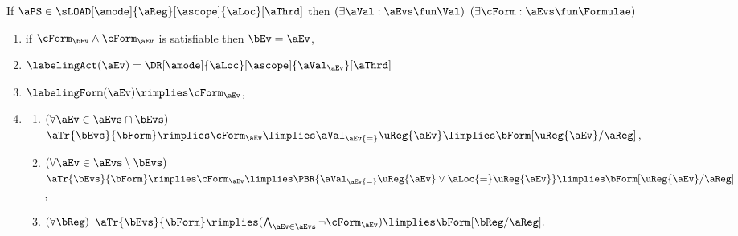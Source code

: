 \medskip
\noindent
If $\aPS \in \sLOAD[\amode]{\aReg}[\ascope]{\aLoc}[\aThrd]$ then
$(\exists\aVal:\aEvs\fun\Val)$
$(\exists\cForm:\aEvs\fun\Formulae)$ 
\begin{enumerate}[topsep=0pt,label=(\textsc{r}\arabic*),ref=\textsc{r}\arabic*]
\item \label{read-E-x}
  if $\cForm_\bEv\land\cForm_\aEv$ is satisfiable then $\bEv=\aEv$,
\item \label{read-lambda-x}
  $\labelingAct(\aEv) = \DR[\amode]{\aLoc}[\ascope]{\aVal_\aEv}[\aThrd]$
\item \label{read-kappa-x}
  \begin{math}
    \labelingForm(\aEv) \rimplies
    \cForm_\aEv
  \end{math},
\item[] 
  \begin{enumerate}[leftmargin=0pt]
  \item \label{read-tau-dependent-x}
    \begin{math}
      (\forall\aEv\in\aEvs\cap\bEvs)
    \end{math}
    \begin{math}
      \aTr{\bEvs}{\bForm} \rimplies
      \cForm_\aEv
      \limplies \aVal_\aEv{=}\uReg{\aEv}
      \limplies \bForm[\uReg{\aEv}/\aReg]
    \end{math},
    
  \item \label{read-tau-independent-x}
    \begin{math}
      (\forall\aEv\in\aEvs\setminus\bEvs)
    \end{math}
    \begin{math}
      \aTr{\bEvs}{\bForm} \rimplies
      \cForm_\aEv 
      \limplies
      \PBR{\aVal_\aEv{=}\uReg{\aEv} \lor \aLoc{=}\uReg{\aEv}}
      \limplies
      \bForm[\uReg{\aEv}/\aReg]
    \end{math},
    
  \item \label{read-tau-empty-x}
    \begin{math}
      (\forall\bReg)
    \end{math}
    \begin{math}
      \aTr{\bEvs}{\bForm} \rimplies 
      (\bigwedge_{\aEv\in\aEvs}\lnot\cForm_\aEv)
      \limplies 
      \bForm[\bReg/\aReg].
    \end{math}  
  \end{enumerate}  
\end{enumerate}
